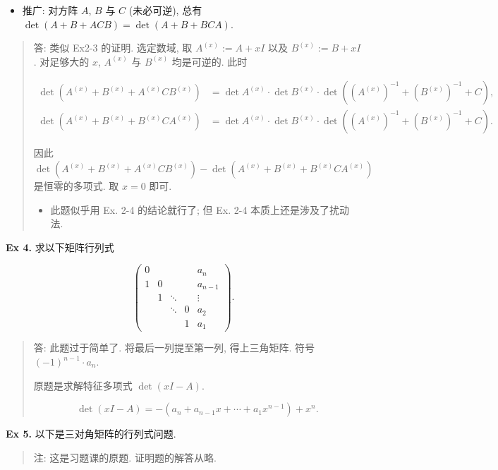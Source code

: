 \documentclass[
]{ctexart}
\begin{document}
\begin{itemize}
\item
  推广: 对方阵 \(A\), \(B\) 与 \(C\) (未必可逆), 总有
  \(\det (A+B+ACB)=\det (A+B+BCA)\).
\end{itemize}

\begin{quote}
答: 类似 Ex2-3 的证明. 选定数域, 取 \(A^{(x)}:=A+xI\) 以及
\(B^{(x)}:=B+xI\). 对足够大的 \(x\), \(A^{(x)}\) 与 \(B^{(x)}\)
均是可逆的. 此时

\begin{align}
\det(A^{(x)}+B^{(x)}+A^{(x)}CB^{(x)})&=\det A^{(x)}\cdot \det B^{(x)}\cdot \det ((A^{(x)})^{-1}+(B^{(x)})^{-1}+C),\\[6pt]
\det(A^{(x)}+B^{(x)}+B^{(x)}CA^{(x)})&=\det A^{(x)}\cdot \det B^{(x)}\cdot \det ((A^{(x)})^{-1}+(B^{(x)})^{-1}+C).
\end{align}

因此
\(\det(A^{(x)}+B^{(x)}+A^{(x)}CB^{(x)})-\det(A^{(x)}+B^{(x)}+B^{(x)}CA^{(x)})\)
是恒零的多项式. 取 \(x=0\) 即可.

\begin{itemize}
\item
  此题似乎用 Ex. 2-4 的结论就行了; 但 Ex. 2-4 本质上还是涉及了扰动法.
\end{itemize}
\end{quote}

 

\textbf{Ex 4.} 求以下矩阵行列式

\[\begin{pmatrix}
0 &  &  &  & a_{n}\\
1 & 0 &  &  & a_{n-1}\\
 & 1 & \ddots  &  & \vdots \\
 &  & \ddots  & 0 & a_{2}\\
 &  &  & 1 & a_{1}
\end{pmatrix}.\]

\begin{quote}
答: 此题过于简单了. 将最后一列提至第一列, 得上三角矩阵. 符号
\((-1)^{n-1}\cdot a_n\).

原题是求解特征多项式 \(\det (xI-A)\).

\[\det (xI-A)=-(a_n+a_{n-1}x+\cdots + a_1x^{n-1})+x^n.\]
\end{quote}

\textbf{Ex 5.} 以下是三对角矩阵的行列式问题.

\begin{quote}
注: 这是习题课的原题. 证明题的解答从略.
\end{quote}
\end{document}
